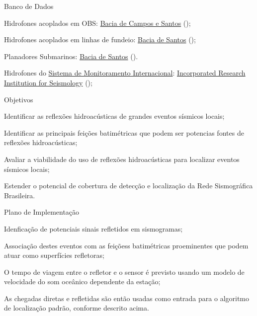 \documentclass[10pt,a4paper,oneside]{book}
\begin{document}
\begin{fancyenum}{\faDatabase}{Banco de Dados}
	\item Hidrofones acoplados em OBS: \href{https://sismo-oceano.ufsc.br/}{Bacia de Campos e Santos} (\faLock);
	\item Hidrofones acoplados em linhas de fundeio: \href{https://comunicabaciadesantos.petrobras.com.br/projeto-de-monitoramento-da-paisagem-acustica-submarina-pmpas-}{Bacia de Santos} (\faLock);
	\item Planadores Submarinos: \href{https://comunicabaciadesantos.petrobras.com.br/projeto-de-monitoramento-da-paisagem-acustica-submarina-pmpas-}{Bacia de Santos} (\faLock).
	\item Hidrofones do \href{https://www.ctbto.org/our-work/international-monitoring-system}{Sistema de Monitoramento Internacional}: \href{https://ds.iris.edu/gmap/\#network=IM\&planet=earth}{Incorporated Research Institution for Seismology} (\faUnlock);
\end{fancyenum}

\begin{fancyenum}{\faFutbol}{Objetivos}
	\item Identificar as reflexões hidroacústicas de grandes eventos sísmicos locais;
	\item Identificar as principais feições batimétricas que podem ser potencias fontes de reflexões hidroacústicas;
	\item Avaliar a viabilidade do uso de reflexões hidroacústicas para localizar eventos sísmicos locais;
	\item Estender o potencial de cobertura de detecção e localização da Rede Sismográfica Brasileira.
\end{fancyenum}

\begin{fancyenum}{\faBrain}{Plano de Implementação}
	\item Idenficação de potenciais sinais refletidos em sismogramas;
	\item Associação destes eventos com as feiçõess batimétricas proeminentes que podem atuar como superfícies refletoras;
	\item O tempo de viagem entre o refletor e o sensor é previsto usando um modelo de velocidade do som oceânico dependente da estação;
	\item As chegadas diretas e refletidas são então usadas como entrada para o algoritmo de localização padrão, conforme descrito acima.
\end{fancyenum}
\end{document}
